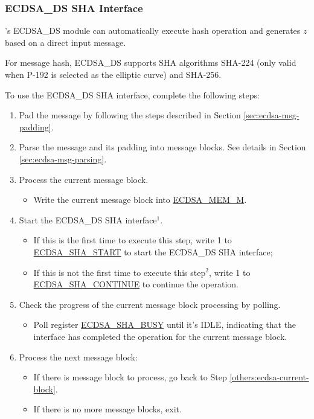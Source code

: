\documentclass[main\_\_EN.tex]{subfiles}
\begin{document}
\subsubsection{ECDSA\_DS SHA Interface}
\label{sec:ecdsa-sha-interface}

\chipseries{}'s ECDSA\_DS module can automatically execute hash operation and generates $z$ based on a direct input message.

For message hash, ECDSA\_DS supports SHA algorithms SHA-224 (only valid when P-192 is selected as the elliptic curve) and SHA-256.

To use the ECDSA\_DS SHA interface, complete the following steps:

\begin{enumerate}
	\item Pad the message by following the steps described in Section \ref{sec:ecdsa-msg-padding}.
	\item Parse the message and its padding into message blocks. See details in Section \ref{sec:ecdsa-msg-parsing}.
	\item \label{others:ecdsa-current-block} Process the current message block.
	      \begin{itemize}
		      \item Write the current message block into \hyperref[tab:ecdsa-memory]{ECDSA\_MEM\_M}.
	      \end{itemize}
	\item Start the ECDSA\_DS SHA interface\hyperref[others:ecdsa-note-sha]{$^1$}.
	      \begin{itemize}
		      \item If this is the first time to execute this step, write 1 to \hyperref[fielddesc:ECDSASHASTART]{ECDSA\_SHA\_START} to start the ECDSA\_DS SHA interface;
		      \item If this is not the first time to execute this step\hyperref[others:ecdsa-note-sha]{$^2$}, write 1 to \hyperref[fielddesc:ECDSASHACONTINUE]{ECDSA\_SHA\_CONTINUE} to continue the operation.
	      \end{itemize}
	\item Check the progress of the current message block processing by polling.
	      \begin{itemize}
		      \item Poll register \hyperref[fielddesc:ECDSASHABUSY]{ECDSA\_SHA\_BUSY} until it's IDLE, indicating that the interface has completed the operation for the current message block.
	      \end{itemize}

	\item Process the next message block:
	      \begin{itemize}
		      \item If there is message block to process, go back to Step \ref{others:ecdsa-current-block}.
		      \item If there is no more message blocks, exit.
	      \end{itemize}

\end{enumerate}
\end{document}
